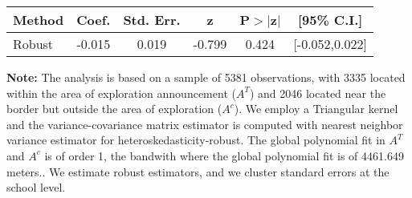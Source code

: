 \begin{table}[htbp]\centering
 \footnotesize 
\begin{tabular}{lccccc}
\hline\hline
Method & Coef. & Std. Err. & z & P$>|$z$|$ & [95\% C.I.] \\ 
\hline \hline  
Robust & -0.015 & 0.019 & -0.799 & 0.424 & [-0.052,0.022] \\ 
  \hline\hline
\end{tabular}
\label{table:rd}
\begin{tablenotes} 
  \justifying \tiny \textbf{Note: }    
   The analysis is based on a sample of 5381 observations, with 3335 located within the area of exploration announcement ($A^{T}$) and 2046 located near the border but outside the area of exploration  ($A^{c}$). 
           We employ a Triangular kernel and the variance-covariance matrix estimator is computed with nearest neighbor variance estimator for heteroskedasticity-robust. The global polynomial fit in  $A^{T}$ and $A^{c}$ is of order 1, the bandwith where the global polynomial fit is of 4461.649 meters.. We estimate robust estimators, and we cluster standard errors at the school level. \end{tablenotes} 
 \end{table} 
